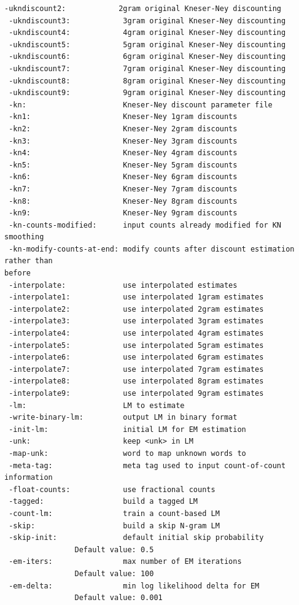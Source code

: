 \documentclass[11pt]{article}
\begin{document}
\begin{Verbatim}[commandchars=\\\{\}]
 -ukndiscount2:            2gram original Kneser-Ney discounting
 -ukndiscount3:            3gram original Kneser-Ney discounting
 -ukndiscount4:            4gram original Kneser-Ney discounting
 -ukndiscount5:            5gram original Kneser-Ney discounting
 -ukndiscount6:            6gram original Kneser-Ney discounting
 -ukndiscount7:            7gram original Kneser-Ney discounting
 -ukndiscount8:            8gram original Kneser-Ney discounting
 -ukndiscount9:            9gram original Kneser-Ney discounting
 -kn:                      Kneser-Ney discount parameter file
 -kn1:                     Kneser-Ney 1gram discounts
 -kn2:                     Kneser-Ney 2gram discounts
 -kn3:                     Kneser-Ney 3gram discounts
 -kn4:                     Kneser-Ney 4gram discounts
 -kn5:                     Kneser-Ney 5gram discounts
 -kn6:                     Kneser-Ney 6gram discounts
 -kn7:                     Kneser-Ney 7gram discounts
 -kn8:                     Kneser-Ney 8gram discounts
 -kn9:                     Kneser-Ney 9gram discounts
 -kn-counts-modified:      input counts already modified for KN smoothing
 -kn-modify-counts-at-end: modify counts after discount estimation rather than
before
 -interpolate:             use interpolated estimates
 -interpolate1:            use interpolated 1gram estimates
 -interpolate2:            use interpolated 2gram estimates
 -interpolate3:            use interpolated 3gram estimates
 -interpolate4:            use interpolated 4gram estimates
 -interpolate5:            use interpolated 5gram estimates
 -interpolate6:            use interpolated 6gram estimates
 -interpolate7:            use interpolated 7gram estimates
 -interpolate8:            use interpolated 8gram estimates
 -interpolate9:            use interpolated 9gram estimates
 -lm:                      LM to estimate
 -write-binary-lm:         output LM in binary format
 -init-lm:                 initial LM for EM estimation
 -unk:                     keep <unk> in LM
 -map-unk:                 word to map unknown words to
 -meta-tag:                meta tag used to input count-of-count information
 -float-counts:            use fractional counts
 -tagged:                  build a tagged LM
 -count-lm:                train a count-based LM
 -skip:                    build a skip N-gram LM
 -skip-init:               default initial skip probability
                Default value: 0.5
 -em-iters:                max number of EM iterations
                Default value: 100
 -em-delta:                min log likelihood delta for EM
                Default value: 0.001

\end{Verbatim}
\end{document}
